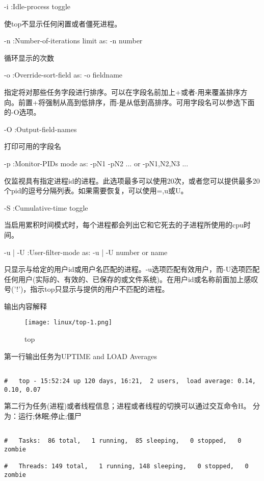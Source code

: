 -i  :Idle-process toggle    \par 
\qquad 使top不显示任何闲置或者僵死进程。

-n  :Number-of-iterations limit as:  -n number  \par 
\qquad  循环显示的次数

-o  :Override-sort-field as:  -o fieldname  \par
\qquad 指定将对那些任务字段进行排序。可以在字段名前加上+或者-用来覆盖排序方向。前置+将强制从高到低排序，而-是从低到高排序。可用字段名可以参选下面的-O选项。

-O  :Output-field-names \par
\qquad 打印可用的字段名

-p  :Monitor-PIDs mode as:  -pN1 -pN2 ...  or  -pN1,N2,N3 ...\par
\qquad 仅监视具有指定进程id的进程。此选项最多可以使用20次，或者您可以提供最多20个pid的逗号分隔列表。如果需要恢复，可以使用=,u或U。

-S  :Cumulative-time toggle \par
\qquad 当启用累积时间模式时，每个进程都会列出它和它死去的子进程所使用的cpu时间。

-u | -U  :User-filter-mode as:  -u | -U number or name\par 
\qquad 只显示与给定的用户id或用户名匹配的进程。-u选项匹配有效用户，而-U选项匹配任何用户(实际的、有效的、已保存的或文件系统)。在用户id或名称前面加上感叹号('!')，指示top只显示与提供的用户不匹配的进程。


输出内容解释

\begin{figure}[H]
    \centering
    \texttt{[image: linux/top-1.png]}
    \caption{top}
\end{figure}


第一行输出任务为UPTIME and LOAD Averages

\begin{lstlisting}[language=cshell]

#   top - 15:52:24 up 120 days, 16:21,  2 users,  load average: 0.14, 0.10, 0.07

\end{lstlisting}

第二行为任务(进程)或者线程信息；进程或者线程的切换可以通过交互命令H。 分为：运行;休眠;停止;僵尸

\begin{lstlisting}[language=cshell]

#   Tasks:  86 total,   1 running,  85 sleeping,   0 stopped,   0 zombie

#   Threads: 149 total,   1 running, 148 sleeping,   0 stopped,   0 zombie

\end{lstlisting}


